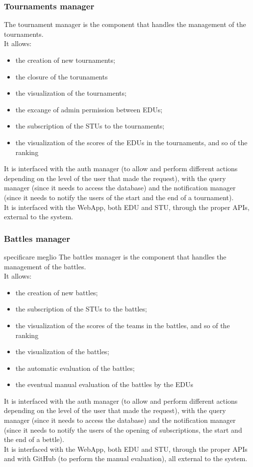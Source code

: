 \subsubsection*{Tournaments manager}
The tournament manager is the component that handles the management of the tournaments.\\
It allows:
\begin{itemize}
    \item the creation of new tournaments;
    \item the closure of the torunaments
    \item the visualization of the tournaments;
    \item the excange of admin permission between EDUs;
    \item the subscription of the STUs to the tournaments;
    \item the visualization of the scores of the EDUs in the tournaments, and so of the ranking
\end{itemize}
It is interfaced with the auth manager (to allow and perform different actions depending on the level of the user that made the request), with the query manager (since it needs to access the database) and the notification manager (since it needs to notify the users of the start and the end of a tournament).\\
It is interfaced with the WebApp, both EDU and STU, through the proper APIs, external to the system.

\subsubsection*{Battles manager}
{\color{red} specificare meglio}
The battles manager is the component that handles the management of the battles.\\
It allows:
\begin{itemize}
    \item the creation of new battles;
    \item the subscription of the STUs to the battles;
    \item the visualization of the scores of the teams in the battles, and so of the ranking
    \item the visualization of the battles;
    \item the automatic evaluation of the battles;
    \item the eventual manual evaluation of the battles by the EDUs
\end{itemize}
It is interfaced with the auth manager (to allow and perform different actions depending on the level of the user that made the request), with the query manager (since it needs to access the database) and the notification manager (since it needs to notify the users of the opening of subscriptions, the start and the end of a bettle).\\
It is interfaced with the WebApp, both EDU and STU, through the proper APIs and with GitHub (to perform the manual evaluation), all external to the system.


